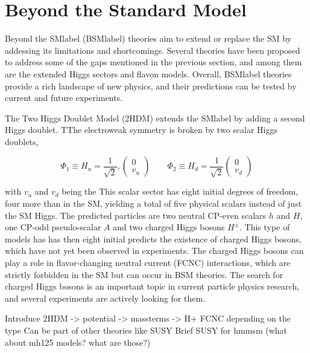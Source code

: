 \section{Beyond the Standard Model}

Beyond the \acrshort{SMlabel} (\acrshort{BSMlabel}) theories aim to extend or replace the \acrshort{SM} by addessing its limitations and shortcomings. Several theories have been proposed to address some of the gaps mentioned in the previous section, and among them are the extended Higgs sectors and flavon models. Overall, \acrshort{BSMlabel} theories provide a rich landscape of new physics, and their predictions can be tested by current and future experiments.

The Two Higgs Doublet Model (2HDM) extends the \acrshort{SMlabel} by adding a second Higgs doublet. TThe electroweak symmetry is broken by two scalar Higgs doublets, 

\begin{equation}
    \Phi_1\equiv H_u = \frac{1}{\sqrt{2}},
    \begin{pmatrix} 0 \\ v_u \end{pmatrix}
    \qquad
    \Phi_2\equiv H_d = \frac{1}{\sqrt{2}}
    \begin{pmatrix} 0 \\ v_d \end{pmatrix}

\end{equation}

with $v_u$ and $v_d$ being the
This scalar sector has eight initial degrees of freedom, four more than in the \acrshort{SM}, yielding a total of five physical scalars instead of just the \acrshort{SM} Higgs. The predicted particles are two neutral CP-even scalars $h$ and $H$, one CP-odd pseudo-scalar $A$ and two charged Higgs bosons $H^\pm$. This type of models has   has then eight initial predicts the existence of charged Higgs bosons, which have not yet been observed in experiments. The charged Higgs bosons can play a role in flavor-changing neutral current (FCNC) interactions, which are strictly forbidden in the SM but can occur in BSM theories. The search for charged Higgs bosons is an important topic in current particle physics research, and several experiments are actively looking for them.

Introduce 2HDM -> potential -> massterms -> H+
FCNC depending on the type
Can be part of other theories like SUSY
Brief SUSY for hmmsm 
(what about mh125 models? what are those?)

